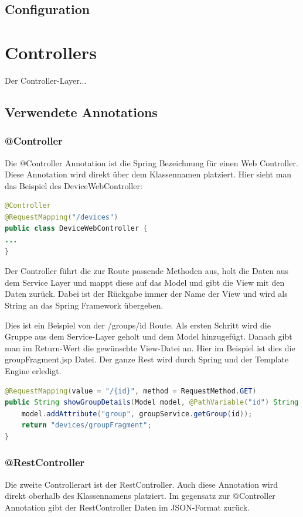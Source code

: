 \subsection{Configuration}






\newpage

\section{Controllers}
Der Controller-Layer... %

\subsection{Verwendete Annotations}
\subsubsection{@Controller}
Die @Controller Annotation ist die Spring Bezeichnung für einen Web Controller. Diese Annotation wird direkt über dem Klassennamen platziert. Hier sieht man das Beispiel des DeviceWebController:
\begin{lstlisting}[language=java]
@Controller
@RequestMapping("/devices")
public class DeviceWebController {
...
}
\end{lstlisting}

Der Controller führt die zur Route passende Methoden aus, holt die Daten aus dem Service Layer und mappt diese auf das Model und gibt die View mit den Daten zurück. Dabei ist der Rückgabe immer der Name der View und wird als String an das Spring Framework übergeben.

Dies ist ein Beispiel von der /groups/id Route. Als ersten Schritt wird die Gruppe aus dem Service-Layer geholt und dem Model hinzugefügt. Danach gibt man im Return-Wert die gewünschte View-Datei an. Hier im Beispiel ist dies die groupFragment.jsp Datei. Der ganze Rest wird durch Spring und der Template Engine erledigt.
\begin{lstlisting}[language=java]
@RequestMapping(value = "/{id}", method = RequestMethod.GET)
public String showGroupDetails(Model model, @PathVariable("id") String id) {
	model.addAttribute("group", groupService.getGroup(id));
	return "devices/groupFragment";
}
\end{lstlisting}
\subsubsection{@RestController}
Die zweite Controllerart ist der RestController. Auch diese Annotation wird direkt oberhalb des Klassennamens platziert. Im gegensatz zur @Controller Annotation gibt der RestController Daten im JSON-Format zurück. 

